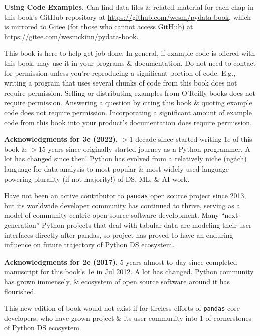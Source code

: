 \documentclass{article}
\begin{document}
{\bf Using Code Examples.} Can find data files \& related material for each chap in this book's GitHub repository at \url{https://github.com/wesm/pydata-book}, which is mirrored to Gitee (for those who cannot access GitHub) at \url{https://gitee.com/wesmckinn/pydata-book}.

This book is here to help get job done. In general, if example code is offered with this book, may use it in your programs \& documentation. Do not need to contact for permission unless you're reproducing a significant portion of code. E.g., writing a program that uses several chunks of code from this book does not require permission. Selling or distributing examples from O'Reilly books does not require permission. Answering a question by citing this book \& quoting example code does not require permission. Incorporating a significant amount of example code from this book into your product's documentation does require permission.

{\bf Acknowledgments for 3e (2022).} $> 1$ decade since started writing 1e of this book \& $> 15$ years since originally started journey as a Python programmer. A lot has changed since then! Python has evolved from a relatively niche (ngách) language for data analysis to most popular \& most widely used language powering plurality (if not majority!) of DS, ML, \& AI work.

Have not been an active contributor to {\tt pandas} open source project since 2013, but its worldwide developer community has continued to thrive, serving as a model of community-centric open source software development. Many ``next-generation'' Python projects that deal with tabular data are modeling their user interfaces directly after pandas, so project has proved to have an enduring influence on future trajectory of Python DS ecosystem.

{\bf Acknowledgments for 2e (2017).} 5 years almost to day since completed manuscript for this book's 1e in Jul 2012. A lot has changed. Python community has grown immensely, \& ecosystem of open source software around it has flourished.

This new edition of book would not exist if for tireless efforts of {\tt pandas} core developers, who have grown project \& its user community into 1 of cornerstones of Python DS ecosystem.
\end{document}
